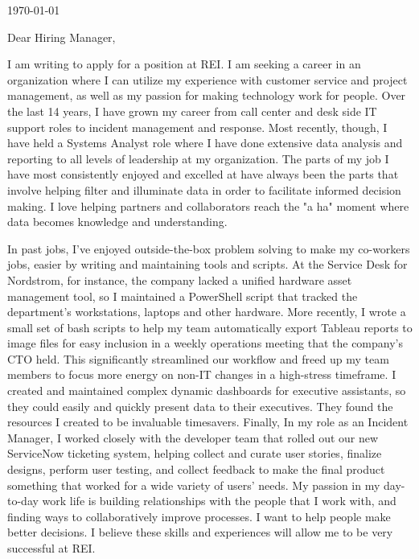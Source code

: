\documentclass[10pt,oneside]{article}
\begin{document}
\hfill\dte\today
\heading
\vspace{\baselineskip}
\vspace{\baselineskip}

Dear Hiring Manager,

\vspace{\baselineskip}

I am writing to apply for a position at REI. I am seeking a career in an organization where I can utilize my experience with customer service and project management, as well as my passion for making technology work for people. Over the last 14 years, I have grown my career from call center and desk side IT support roles to incident management and response. Most recently, though, I have held a Systems Analyst role where I have done extensive data analysis and reporting to all levels of leadership at my organization. The parts of my job I have most consistently enjoyed and excelled at have always been the parts that involve helping filter and illuminate data in order to facilitate informed decision making. I love helping partners and collaborators reach the "a ha" moment where data becomes knowledge and understanding.

\vspace{\baselineskip}

In past jobs, I’ve enjoyed outside-the-box problem solving to make my co-workers jobs, easier by writing and maintaining tools and scripts. At the Service Desk for Nordstrom, for instance, the company lacked a unified hardware asset management tool, so I maintained a PowerShell script that tracked the department’s workstations, laptops and other hardware. More recently, I wrote a small set of bash scripts to help my team automatically export Tableau reports to image files for easy inclusion in a weekly operations meeting that the company’s CTO held. This significantly streamlined our workflow and freed up my team members to focus more energy on non-IT changes in a high-stress timeframe. I created and maintained complex dynamic dashboards for executive assistants, so they could easily and quickly present data to their executives. They found the resources I created to be invaluable timesavers. Finally, In my role as an Incident Manager, I worked closely with the developer team that rolled out our new ServiceNow ticketing system, helping collect and curate user stories, finalize designs, perform user testing, and collect feedback to make the final product something that worked for a wide variety of users' needs.  My passion in my day-to-day work life is building relationships with the people that I work with, and finding ways to collaboratively improve processes. I want to help people make better decisions. I believe these skills and experiences will allow me to be very successful at REI.
\end{document}

